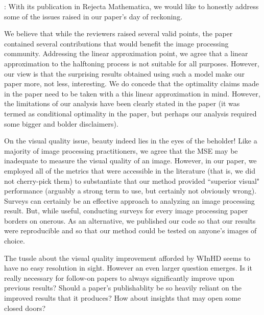 \documentclass[11pt]{article}
\begin{document}
: With its publication in Rejecta Mathematica, we would like to honestly address some of the issues raised in our paper's day of reckoning.

We believe that while the reviewers raised several valid points, the
paper contained several contributions that would benefit the image
processing community.  Addressing the linear approximation point, we
agree that a linear approximation to the halftoning process is not
suitable for all purposes. However, our view is that the surprising
results obtained using such a model make our paper more, not less,
interesting.  We do concede that the optimality claims made in the paper
need to be taken with a this linear approximation in mind.  However, the
limitations of our analysis have been clearly stated in the paper (it
was termed as conditional optimality in the paper, but perhaps our
analysis required some bigger and bolder disclaimers).

On the visual quality issue, beauty indeed lies in the eyes of the
beholder!  Like a majority of image processing practitioners, we agree
that the MSE may be inadequate to measure the visual quality of an
image. However, in our paper, we employed all of the metrics that were
accessible in the literature (that is, we did not cherry-pick them) to
substantiate that our method provided ``superior visual" performance
(arguably a strong term to use, but certainly not obviously wrong).
Surveys can certainly be an effective approach to analyzing an image
processing result. But, while useful, conducting surveys for every image
processing paper borders on onerous. As an alternative, we published our
code so that our results were reproducible and so that our method could
be tested on anyone's images of choice.

The tussle about the visual quality improvement afforded by WInHD seems
to have no easy resolution in sight. However an even larger question
emerges. Is it really necessary for follow-on papers to always
significantly improve upon previous results?  Should a paper's
publishablity be so heavily reliant on the improved results that it
produces?  How about insights that may open some closed doors?
\end{document}
